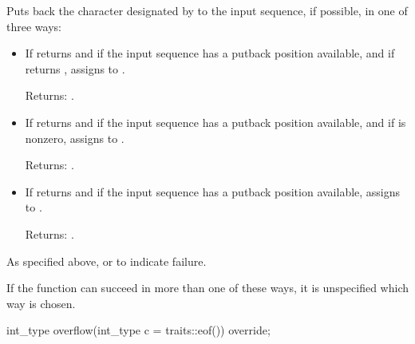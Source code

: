 \begin{itemdescr}
\pnum
\effects
Puts back the character designated by  to the input
sequence, if possible, in one of three ways:
\begin{itemize}
\item
If
returns
and
if the input sequence has a putback position available, and
if
returns
,
assigns
to
.

Returns:
.
\item
If
returns
and if the input sequence
has a putback position available, and
if 
\tcode{\&}
 is
nonzero,
assigns  to
.

Returns:
.
\item
If
returns
and if the input sequence has a putback position available,
assigns
to
.

Returns:
.
\end{itemize}

\pnum
\returns
As specified above, or
to indicate failure.

\pnum
\remarks
If the function can succeed in more than one of these ways, it is
unspecified which way is chosen.
%
\end{itemdescr}

%
\begin{itemdecl}
int_type overflow(int_type c = traits::eof()) override;
\end{itemdecl}

